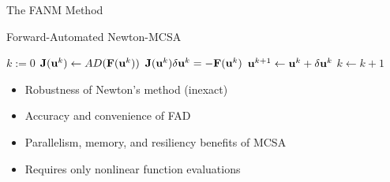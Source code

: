 \documentclass{beamer}
\begin{document}
\begin{frame}[fragile]{The FANM Method}

  Forward-Automated Newton-MCSA

  \pause
  \begin{algorithm}[H]
    \begin{algorithmic}[1]
      \STATE $k := 0$ 
      \STATE $\mathbf{J}(\mathbf{u}^{k}) \leftarrow AD(\mathbf{F}(\mathbf{u}^k))$ 
      \STATE $\mathbf{J}(\mathbf{u}^k) \delta \mathbf{u}^k = -\mathbf{F}(\mathbf{u}^{k})$
      \STATE $\mathbf{u}^{k+1} \leftarrow \mathbf{u}^k + \delta \mathbf{u}^k$ 
      \STATE $k \leftarrow k+1$ 
      \ENDWHILE
    \end{algorithmic}
    \caption{FANM}
  \end{algorithm}

  \pause
  \begin{itemize}
  \item Robustness of Newton's method (inexact)
  \item Accuracy and convenience of FAD
  \item Parallelism, memory, and resiliency benefits of MCSA
  \item Requires only nonlinear function evaluations
  \end{itemize}


\end{frame}
\end{document}
